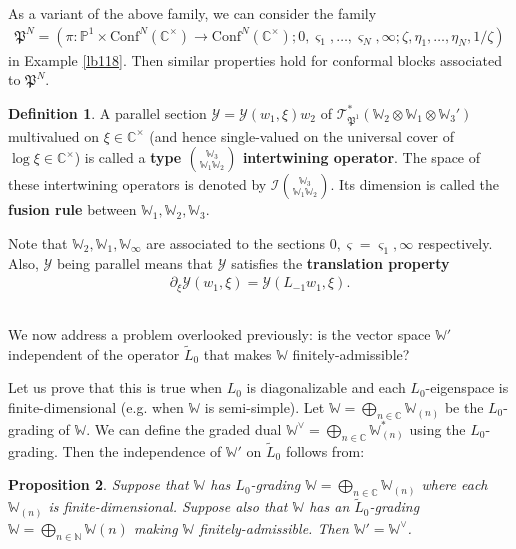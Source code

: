 \documentclass[11pt,b5paper,notitlepage]{article}
\theoremstyle{definition}
\newtheorem{df}{Definition}[section]
\theoremstyle{plain}
\newtheorem{pp}[df]{Proposition}
\newcommand{\fk}{\mathfrak}
\newcommand{\mc}{\mathcal}
\newcommand{\wtd}{\widetilde}
\newcommand{\Conf}{\mathrm{Conf}}
\newcommand{\scr}{\mathscr}
\newcommand{\sgm}{\varsigma}
\newcommand{\Wbb}{\mathbb W}
\newcommand{\Cbb}{\mathbb C}
\newcommand{\Nbb}{\mathbb N}
\newcommand{\Pbb}{\mathbb P}
\numberwithin{equation}{section}
\begin{document}
As a variant of the above family, we can consider the family
\begin{align*}
\fk P^N=(\pi:\Pbb^1\times\Conf^N(\Cbb^\times)\rightarrow\Conf^N(\Cbb^\times);0,\sgm_1,\dots,\sgm_N,\infty;\zeta,\eta_1,\dots,\eta_N,1/\zeta)
\end{align*}
in Example \ref{lb118}. Then similar properties hold for conformal blocks associated to $\fk P^N$.

\begin{df}
A  parallel section $\mc Y=\mc Y(w_1,\xi)w_2$ of $\scr T_{\fk P^1}^*(\Wbb_2\otimes\Wbb_1\otimes \Wbb_3')$ multivalued on $\xi\in\Cbb^\times$ (and hence single-valued on the universal cover of $\log\xi\in\Cbb^\times$) is called a \textbf{type $\Wbb_3\choose \Wbb_1\Wbb_2$ intertwining operator}. The space of these intertwining operators is denoted by $\mc I{\Wbb_3\choose \Wbb_1\Wbb_2}$. Its dimension is called the \textbf{fusion rule} between $\Wbb_1,\Wbb_2,\Wbb_3$.
\end{df}
Note that $\Wbb_2,\Wbb_1,\Wbb_\infty$ are associated to the sections $0,\sgm=\sgm_1,\infty$ respectively. Also, $\mc Y$ being parallel means that $\mc Y$ satisfies the \textbf{translation property}
\begin{align}
\partial_\xi\mc Y(w_1,\xi)=\mc Y(L_{-1}w_1,\xi).
\end{align}






\subsection{}


We now address a problem overlooked previously: is the vector space $\Wbb'$ independent of the operator $\wtd L_0$ that makes $\Wbb$ finitely-admissible?

Let us prove that this is true when $L_0$ is diagonalizable and each $L_0$-eigenspace is finite-dimensional (e.g. when $\Wbb$ is semi-simple).  Let $\Wbb=\bigoplus_{n\in\Cbb}\Wbb_{(n)}$ be the $L_0$-grading of $\Wbb$. We can define the graded dual $\Wbb^\vee=\bigoplus_{n\in\Cbb}\Wbb_{(n)}^*$ using the $L_0$-grading. Then the independence of $\Wbb'$ on $\wtd L_0$ follows from:

\begin{pp}
Suppose that $\Wbb$ has $L_0$-grading $\Wbb=\bigoplus_{n\in\Cbb}\Wbb_{(n)}$ where each $\Wbb_{(n)}$ is finite-dimensional. Suppose also that $\Wbb$ has an $\wtd L_0$-grading $\Wbb=\bigoplus_{n\in\Nbb}\Wbb(n)$ making $\Wbb$ finitely-admissible. Then $\Wbb'=\Wbb^\vee$.
\end{pp}
\end{document}
